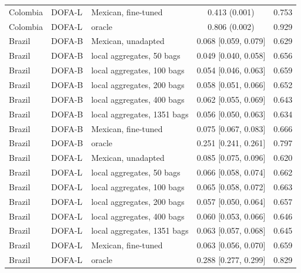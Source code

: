 \begin{table}[htbp]
{\begin{tabular}{lllcc}
Colombia & DOFA-L & Mexican, fine-tuned & 0.413 (0.001) & 0.753\\
Colombia & DOFA-L & oracle & 0.806 (0.002) & 0.929\\
\midrule
Brazil & DOFA-B & Mexican, unadapted & 0.068 [0.059, 0.079] & 0.629\\
Brazil & DOFA-B & local aggregates, 50 bags & 0.049 [0.040, 0.058] & 0.656\\
Brazil & DOFA-B & local aggregates, 100 bags & 0.054 [0.046, 0.063] & 0.659\\
Brazil & DOFA-B & local aggregates, 200 bags & 0.058 [0.051, 0.066] & 0.652\\
Brazil & DOFA-B & local aggregates, 400 bags & 0.062 [0.055, 0.069] & 0.643\\
Brazil & DOFA-B & local aggregates, 1351 bags & 0.056 [0.050, 0.063] & 0.634\\
Brazil & DOFA-B & Mexican, fine-tuned & 0.075 [0.067, 0.083] & 0.666\\
Brazil & DOFA-B & oracle & 0.251 [0.241, 0.261] & 0.797\\
Brazil & DOFA-L & Mexican, unadapted & 0.085 [0.075, 0.096] & 0.620\\
Brazil & DOFA-L & local aggregates, 50 bags & 0.066 [0.058, 0.074] & 0.662\\
Brazil & DOFA-L & local aggregates, 100 bags & 0.065 [0.058, 0.072] & 0.663\\
Brazil & DOFA-L & local aggregates, 200 bags & 0.057 [0.050, 0.064] & 0.657\\
Brazil & DOFA-L & local aggregates, 400 bags & 0.060 [0.053, 0.066] & 0.646\\
Brazil & DOFA-L & local aggregates, 1351 bags & 0.063 [0.057, 0.068] & 0.645\\
Brazil & DOFA-L & Mexican, fine-tuned & 0.063 [0.056, 0.070] & 0.659\\
Brazil & DOFA-L & oracle & 0.288 [0.277, 0.299] & 0.829\\
\bottomrule
\end{tabular}}
\label{tab:transfer}
\end{table}
